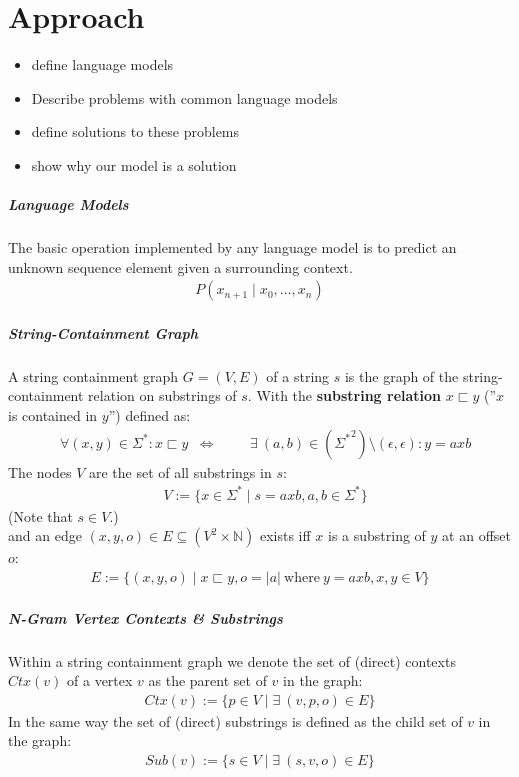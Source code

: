 \chapter{Approach}

\begin{itemize}
\item define language models
\item Describe problems with common language models
\item define solutions to these problems 
\item show why our model is a solution
\end{itemize}

\newcommand{\NN}{\mathbb{N}}

\paragraph*{Language Models}
The basic operation implemented by any language model is to predict an unknown sequence element given a surrounding context.
\begin{align}
    P(x_{n+1} \mid x_0, \ldots, x_n)
\end{align}

\paragraph*{String-Containment Graph}
A string containment graph $G = (V, E)$ of a string $s$ is the graph of the string-containment relation on substrings of $s$. With the \textbf{substring relation} $x \sqsubset y$ (''$x$ is contained in $y$'') defined as:
\begin{align}
    & \forall (x, y) \in \Sigma^*: x \sqsubset y &\Leftrightarrow& \quad &\exists \ (a, b) \in ({\Sigma^*}^2) \setminus {(\epsilon, \epsilon)}: y = axb
\end{align}
The nodes $V$ are the set of all substrings in $s$:
\begin{align}
    &V := \{ x \in \Sigma^* \mid s = axb, a, b \in \Sigma^*\}
\end{align}
(Note that $s \in V$.)\\
and an edge $(x, y, o) \in E \subseteq (V^2 \times \NN) $ exists iff $x$ is a substring of $y$ at an offset $o$:
\begin{align}
    E := \{ (x, y, o) \mid x \sqsubset y, o = |a| \ \text{where} \ y = axb, x, y \in V \}
\end{align}

\paragraph*{N-Gram Vertex Contexts \& Substrings}
Within a string containment graph we denote the set of (direct) contexts $Ctx(v)$ of a vertex $v$ as the parent set of $v$ in the graph:
\begin{align}
    Ctx(v) := \{ p \in V \mid \exists \ (v, p, o) \in E \}
\end{align}
In the same way the set of (direct) substrings is defined as the child set of $v$ in the graph:
\begin{align}
    Sub(v) := \{ s \in V \mid \exists \ (s, v, o) \in E \}
\end{align}

